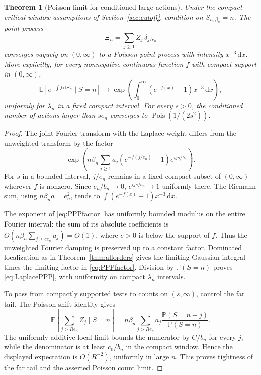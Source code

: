 \documentclass[11pt,a4paper]{article}
\numberwithin{equation}{section}
\newtheorem{theorem}{Theorem}[section]
\theoremstyle{definition}
\theoremstyle{remark}
\DeclareMathOperator{\Pois}{Pois}
\newcommand{\E}{\mathbb E}
\newcommand{\Prob}{\mathbb P}
\newcommand{\dd}{\,\mathrm d}
\begin{document}
\begin{theorem}[Poisson limit for conditioned large actions]
\label{thm:PPP}
Under the compact critical-window assumptions of
Section~\ref{sec:cutoff}, condition on $S_{n,\beta_n}=n$. The point process
\begin{equation}\label{eq:Xi}
 \Xi_n=\sum_{j\ge1}Z_j\,\delta_{j/e_n}
\end{equation}
converges vaguely on $(0,\infty)$ to a Poisson point process with intensity
$x^{-3}\dd x$. More explicitly, for every nonnegative continuous function
$f$ with compact support in $(0,\infty)$,
\begin{equation}\label{eq:LaplacePPP}
 \E\left[e^{-\int f\dd\Xi_n}\mid S=n\right]
 \longrightarrow
 \exp\left(\int_0^\infty(e^{-f(x)}-1)x^{-3}\dd x\right),
\end{equation}
uniformly for $\lambda_n$ in a fixed compact interval.
For every $s>0$, the conditioned number of actions larger than $se_n$
converges to $\Pois(1/(2s^2))$.
\end{theorem}
\begin{proof}
The joint Fourier transform with the Laplace weight differs from the
unweighted transform by the factor
\begin{equation}\label{eq:PPPfactor}
 \exp\left(n\beta_n\sum_{j\ge1}a_j
  (e^{-f(j/e_n)}-1)e^{ijs/b_n}\right).
\end{equation}
For $s$ in a bounded interval, $j/e_n$ remains in a fixed compact subset
of $(0,\infty)$ wherever $f$ is nonzero. Since $e_n/b_n\to0$,
$e^{ijs/b_n}\to1$ uniformly there. The Riemann sum, using
$n\beta_n a=e_n^2$, tends to
$\int(e^{-f(x)}-1)x^{-3}\dd x$.

The exponent of \eqref{eq:PPPfactor} has uniformly bounded modulus on
the entire Fourier interval: the sum of its absolute coefficients is
$O(n\beta_n\sum_{j\ge c e_n}a_j)=O(1)$, where $c>0$ is below the
support of $f$. Thus the unweighted Fourier damping is preserved up to
a constant factor. Dominated localization as in
Theorem~\ref{thm:allorders} gives the limiting Gaussian integral times
the limiting factor in \eqref{eq:PPPfactor}. Division by
$\Prob(S=n)$ proves \eqref{eq:LaplacePPP}, with uniformity on compact
$\lambda_n$ intervals.

To pass from compactly supported tests to counts on $(s,\infty)$, control
the far tail. The Poisson shift identity gives
\[
 \E\left[\sum_{j>Re_n}Z_j\mid S=n\right]
 =n\beta_n\sum_{j>Re_n}a_j
        \frac{\Prob(S=n-j)}{\Prob(S=n)}.
\]
The uniformly additive local limit bounds the numerator by $C/b_n$
for every $j$, while the denominator is at least $c_0/b_n$ in the
compact window. Hence the displayed expectation is $O(R^{-2})$,
uniformly in large $n$. This proves tightness of the far tail and the
asserted Poisson count limit.
\end{proof}
\end{document}
